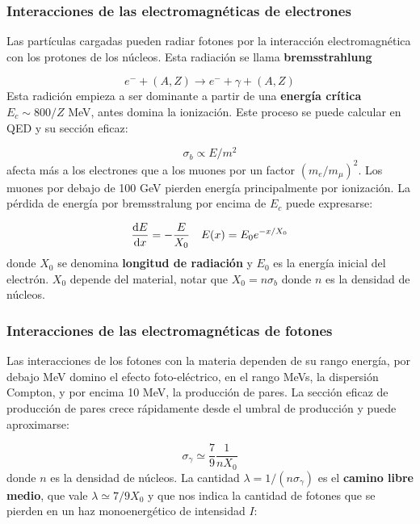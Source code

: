 \subsubsection{Interacciones de las electromagnéticas de electrones}

Las partículas cargadas pueden radiar fotones por la interacción electromagnética con los protones de los núcleos. Esta radiación se llama \textbf{bremsstrahlung}

\begin{equation}
	e^- + (A,Z) \rightarrow e^- + \gamma + (A,Z)
\end{equation}
Esta radición empieza a ser dominante a partir de una \textbf{energía crítica} $E_c \sim 800 /Z$ MeV, antes domina la ionización. Este proceso se puede calcular en QED y su sección eficaz:

\begin{equation}
	\sigma_b  \propto E/m^2 
\end{equation}
afecta más a los electrones que a los muones por un factor $(m_e/m_\mu)^2$. Los muones por debajo de 100 GeV pierden energía principalmente por ionización. La pérdida de energía por bremsstralung por encima de $E_c$ puede expresarse:

\begin{equation}
	\frac{\mathrm{d} E}{\mathrm{d} x} = - \frac{E}{X_0} \quad E(x)=E_0 e^{-x/X_0}
\end{equation}
donde $X_0$ se denomina \textbf{longitud de radiación} y $E_0$ es la energía inicial del electrón. $X_0$ depende del material, notar que $X_0=n\sigma_b$ donde $n$ es la densidad de núcleos.


\subsubsection{Interacciones de las electromagnéticas de fotones}

Las interacciones de los fotones con la materia dependen de su rango energía, por debajo MeV domino el efecto foto-eléctrico, en el rango MeVs, la dispersión Compton, y por encima 10 MeV, la producción de pares. La sección eficaz de producción de pares crece rápidamente desde el umbral de producción y puede aproximarse:

\begin{equation}
	\sigma_\gamma \simeq \frac{7}{9} \frac{1}{nX_0}
\end{equation}
donde $n$ es la densidad de núcleos. La cantidad $\lambda=1/(n\sigma_\gamma)$ es el \textbf{camino libre medio}, que vale $\lambda\simeq7/9 X_0$ y que nos indica la cantidad de fotones que se pierden en un haz monoenergético de intensidad $I$:

